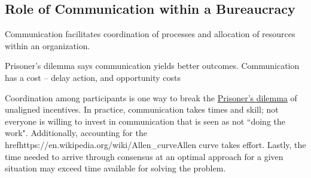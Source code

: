 \subsection{Role of Communication within a Bureaucracy}

Communication facilitates coordination of processes and allocation of resources within an organization. 


Prisoner's dilemma says communication yields better outcomes.
Communication has a cost -- delay action, and opportunity costs


Coordination among participants is one way to break the \href{https://en.wikipedia.org/wiki/Prisoner\%27s\_dilemma}{Prisoner's dilemma} of unaligned incentives. In practice, communication takes times and skill; not everyone is willing to invest in communication that is seen as not ``doing the work". Additionally, accounting for the \\href{https://en.wikipedia.org/wiki/Allen\_curve}{Allen curve} takes effort. Lastly, the time needed to arrive through consensus at an optimal approach for a given situation may exceed time available for solving the problem.
 